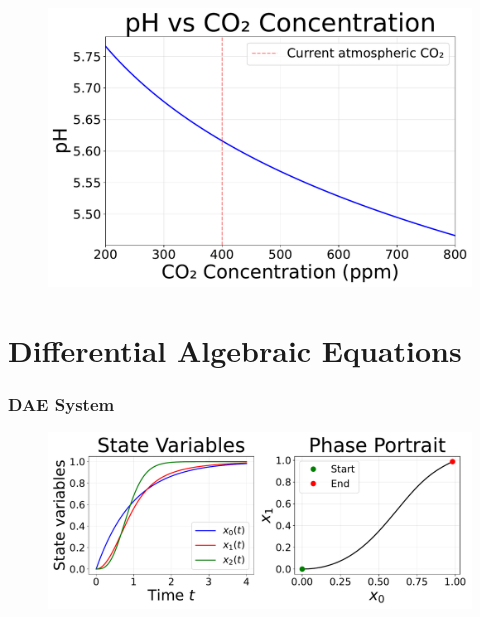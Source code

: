 \documentclass{beamer}
\begin{document}
\begin{frame}
\begin{figure}
\includegraphics[scale=0.4]{../plots/pH_vs_CO2_concentration.pdf}
\end{figure}
\end{frame}

\section{Differential Algebraic Equations}
\frametitle{DAE System}

\begin{frame}

\end{frame}

\begin{frame}

\end{frame}

\begin{frame}

\end{frame}

\begin{frame}


\end{frame}

\begin{frame}


\end{frame}

\begin{frame}
\begin{figure}
\includegraphics[scale=0.35]{../plots/dae_system.pdf}
\end{figure}
\end{frame}
\end{document}
